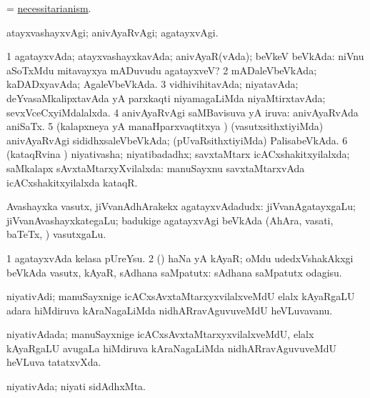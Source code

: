 \bentry
{}
\gl{\nA}
\bmng
= \hyperlink{necessitarianism}{necessitarianism}. 
\emng
\eentry

\bentry
{}
\gl{\kirxvi}
\bmng
atayxvashayxvAgi; anivAyaRvAgi; agatayxvAgi. 
\emng
\eentry

\bentry
{}
\gl{\gu}
\bmng
\bnum
\num{1} agatayxvAda; atayxvashayxkavAda; anivAyaR(vAda); beVkeV beVkAda:  niVnu aSoTxMdu mitavayxya mADuvudu agatayxveV? 
\num{2} mADaleVbeVkAda; kaDADxyavAda; AgaleVbeVkAda. 
\num{3} vidhivihitavAda; niyatavAda; deYvasaMkalipxtavAda yA parxkaqti niyamagaLiMda niyaMtirxtavAda; sevxVceCxyiMdalalxda. 
\num{4} anivAyaRvAgi saMBavisuva yA iruva:  anivAyaRvAda aniSaTx. 
\num{5} (kalapxneya yA manaHparxvaqtitxya \vi) (vasutxsithxtiyiMda) anivAyaRvAgi sididhxsaleVbeVkAda; (pUvaRsithxtiyiMda) PalisabeVkAda. 
\num{6} (kataqRvina \vi) niyativasha; niyatibadadhx; savxtaMtarx icACxshakitxyilalxda; saMkalapx sAvxtaMtarxyXvilalxda:  manuSayxnu savxtaMtarxvAda icACxshakitxyilalxda kataqR. 
\enum
\emng
\eentry

\bentry
{}
\gl{\nA}
\bmng
Avashayxka vasutx, jiVvanAdhArakekx agatayxvAdadudx:  jiVvanAgatayxgaLu; jiVvanAvashayxkategaLu; badukige agatayxvAgi beVkAda (AhAra, vasati, baTeTx, \mo) vasutxgaLu. 
\emng

\noindent
\gl{\pagu}
\bmng
\bnum
\num{1}  agatayxvAda kelasa pUreYsu. 
\num{2}  (\AmA) haNa yA kAyaR; oMdu udedxVshakAkxgi beVkAda vasutx, kAyaR, sAdhana saMpatutx:  sAdhana saMpatutx odagisu. 
\enum
\emng
\eentry

\bentry
{}
\gl{\nA}
\bmng
niyativAdi; manuSayxnige icACxsAvxtaMtarxyxvilalxveMdU elalx kAyaRgaLU adara hiMdiruva kAraNagaLiMda nidhARravAguvuveMdU heVLuvavanu. 
\emng
\eentry

\bentry
{}
\gl{\gu}
\bmng
niyativAdada; manuSayxnige icACxsAvxtaMtarxyxvilalxveMdU, elalx kAyaRgaLU avugaLa hiMdiruva kAraNagaLiMda nidhARravAguvuveMdU heVLuva tatatxvXda. 
\emng
\eentry

\bentry
{}
\gl{\nA}
\bmng
niyativAda; niyati sidAdhxMta. 
\emng
\eentry

